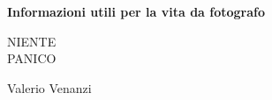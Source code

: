 \begin{titlepage}
    \begin{center}
        
        \vspace*{1cm}
            
        \LARGE
        \textbf{Informazioni utili per la vita da fotografo}
            
        \vspace{0.5cm}
        \large
        NIENTE\\
        PANICO

        \vspace*{\fill}
        Valerio Venanzi

    \end{center}
\end{titlepage}



